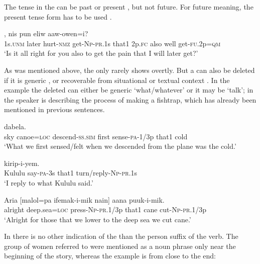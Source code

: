 The tense in the  can be past  or present , but not future. For future meaning, the present tense form has to be used . 

\ea%
\label{ex:8:x1531}
,  nis  pun  eliw aaw-owen=i?\\
1s.\textsc{unm} later  hurt-\textsc{nmz} get-\textsc{Np}-\textsc{pr}.1s  that1  2p.\textsc{fc} also  well get-\textsc{fu}.2p=\textsc{qm}\\
\glt`Is it all right for you also to get the pain that I will later get?'
\z


As was mentioned above, the  only rarely shows overtly. But a  can also be deleted if it is generic , or recoverable from situational  or textual context . In the example  the deleted  can either be generic `what/whatever' or it may be  `talk'; in  the speaker is describing the process of making a fishtrap, which has already been mentioned in previous sentences.

\ea%
\label{ex:8:x1561}
\gll [Iinan  aasa=pa  or-omi  kiikir  furew-a-mik  nain]  dabela.  \\
sky  canoe=\textsc{loc} descend-\textsc{ss}.\textsc{sim} first  sense-\textsc{pa}-1/3p that1 cold\\
\glt`What we first sensed/felt when we descended from the plane was the cold.'
\z


\ea%
\label{ex:8:x1555}
  kirip-i-yem. \\
Kululu  say-\textsc{pa}-3s that1 turn/reply-\textsc{Np}-\textsc{pr}.1s\\
\glt`I reply to what Kululu said.'
\z


\ea%
\label{ex:8:x1559}
\gll Aria  [malol=pa  ifemak-i-mik  nain]  aana puuk-i-mik.\\
alright  deep.sea=\textsc{loc} press-\textsc{Np}-\textsc{pr}.1/3p  that1 cane cut-\textsc{Np}-\textsc{pr}.1/3p\\
\glt`Alright for those that we lower to the deep sea we cut cane.'
\z


In  there is no other indication of the   than the person suffix of the verb. The group of women referred to were mentioned as a noun phrase only near the beginning of the story, whereas the example is from close to the end:

